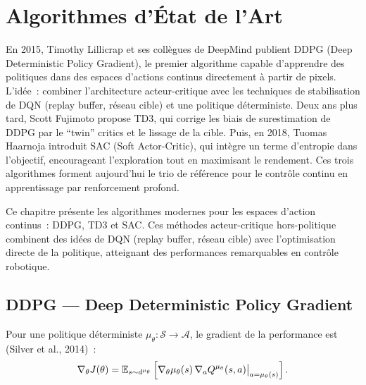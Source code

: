 \chapter{Algorithmes d'\'Etat de l'Art}
\label{ch:etat_art}

En 2015, Timothy Lillicrap et ses coll\`egues de DeepMind publient DDPG (Deep Deterministic Policy Gradient), le premier algorithme capable d'apprendre des politiques dans des espaces d'actions continus directement \`a partir de pixels. L'id\'ee~: combiner l'architecture acteur-critique avec les techniques de stabilisation de DQN (replay buffer, r\'eseau cible) et une politique d\'eterministe. Deux ans plus tard, Scott Fujimoto propose TD3, qui corrige les biais de surestimation de DDPG par le ``twin'' critics et le lissage de la cible. Puis, en 2018, Tuomas Haarnoja introduit SAC (Soft Actor-Critic), qui int\`egre un terme d'entropie dans l'objectif, encourageant l'exploration tout en maximisant le rendement. Ces trois algorithmes forment aujourd'hui le trio de r\'ef\'erence pour le contr\^ole continu en apprentissage par renforcement profond.

\begin{intuition}
Ce chapitre pr\'esente les algorithmes modernes pour les espaces d'action continus~:
DDPG, TD3 et SAC. Ces m\'ethodes acteur-critique hors-politique combinent
des id\'ees de DQN (replay buffer, r\'eseau cible) avec l'optimisation directe
de la politique, atteignant des performances remarquables en contr\^ole robotique.
\end{intuition}

\section{DDPG --- Deep Deterministic Policy Gradient}

\begin{definition}
Pour une politique d\'eterministe $\mu_\theta : \mathcal{S} \to \mathcal{A}$,
le gradient de la performance est (Silver et al., 2014)~:
\[
    \nabla_\theta J(\theta) = \mathbb{E}_{s \sim d^{\mu_\theta}}\left[
    \nabla_\theta \mu_\theta(s) \, \nabla_a Q^{\mu_\theta}(s, a)\big|_{a=\mu_\theta(s)}
    \right].
\]
\end{definition}


